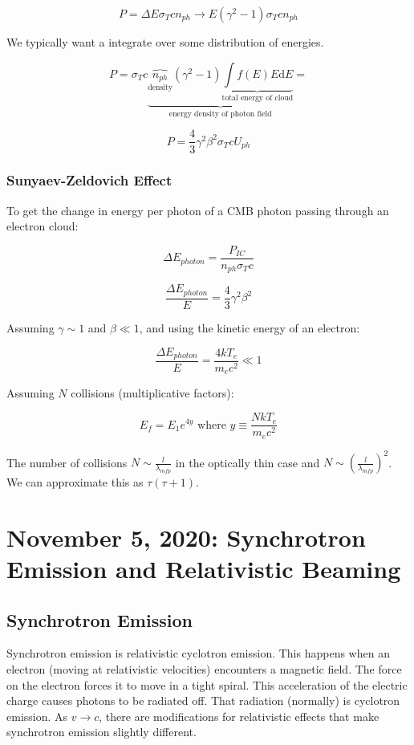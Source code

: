 \documentclass{article}
\begin{document}
$$
P = \Delta E \sigma_T c n_{ph} \rightarrow E\left(\gamma^2-1\right) \sigma_T c n_{ph}
$$

We typically want a integrate over some distribution of energies.

$$
P = \sigma_T c \underbrace{\overbrace{n_{ph}}_\text{density} \left(\gamma^2-1\right) \underbrace{\int f(E) E \mathrm{d}E}_\text{total energy of cloud}}_\text{energy density of photon field} = 
$$

$$
P = \frac43 \gamma^2 \beta^2 \sigma_T c U_{ph}
$$

\subsubsection{Sunyaev-Zeldovich Effect}

To get the change in energy per photon of a CMB photon passing through an electron cloud:

$$
\Delta E_{photon} = \frac{P_{IC}}{n_{ph} \sigma_T c}
$$

$$
\frac{\Delta E_{photon}}{E} = \frac43 \gamma^2 \beta^2
$$

Assuming $\gamma \sim 1$ and $\beta\ll1$, and using the kinetic energy of an electron:

$$
\frac{\Delta E_{photon}}{E} = \frac{4kT_e}{m_e c^2} \ll 1
$$

Assuming $N$ collisions (multiplicative factors):

$$
E_f = E_1 e^{4y} \text{ where } y \equiv \frac{NkT_e}{m_e c^2}
$$

The number of collisions $N \sim \frac{l}{\lambda_{mfp}}$ in the optically thin case and $N \sim \left(\frac{l}{\lambda_{mfp}}\right)^{2}$. We can approximate this as $\tau\left(\tau+1\right)$. 

\newpage
\section{November 5, 2020: Synchrotron Emission and Relativistic Beaming}

\subsection{Synchrotron Emission}

Synchrotron emission is relativistic cyclotron emission. This happens when an electron (moving at relativistic velocities) encounters a magnetic field. The force on the electron forces it to move in a tight spiral. This acceleration of the electric charge causes photons to be radiated off. That radiation (normally) is cyclotron emission. As $v \to c$, there are modifications for relativistic effects that make synchrotron emission slightly different.
\end{document}
